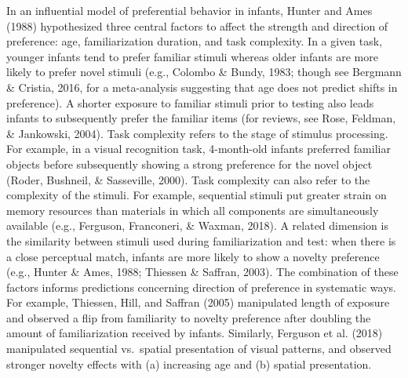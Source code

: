 \documentclass[
  english,
  man,man,floatsintext]{apa6}
\begin{document}
In an influential model of preferential behavior in infants, Hunter and Ames (1988) hypothesized three central factors to affect the strength and direction of preference: age, familiarization duration, and task complexity. In a given task, younger infants tend to prefer familiar stimuli whereas older infants are more likely to prefer novel stimuli (e.g., Colombo \& Bundy, 1983; though see Bergmann \& Cristia, 2016, for a meta-analysis suggesting that age does not predict shifts in preference). A shorter exposure to familiar stimuli prior to testing also leads infants to subsequently prefer the familiar items (for reviews, see Rose, Feldman, \& Jankowski, 2004). Task complexity refers to the stage of stimulus processing. For example, in a visual recognition task, 4-month-old infants preferred familiar objects before subsequently showing a strong preference for the novel object (Roder, Bushneil, \& Sasseville, 2000). Task complexity can also refer to the complexity of the stimuli. For example, sequential stimuli put greater strain on memory resources than materials in which all components are simultaneously available (e.g., Ferguson, Franconeri, \& Waxman, 2018). A related dimension is the similarity between stimuli used during familiarization and test: when there is a close perceptual match, infants are more likely to show a novelty preference (e.g., Hunter \& Ames, 1988; Thiessen \& Saffran, 2003). The combination of these factors informs predictions concerning direction of preference in systematic ways. For example, Thiessen, Hill, and Saffran (2005) manipulated length of exposure and observed a flip from familiarity to novelty preference after doubling the amount of familiarization received by infants. Similarly, Ferguson et al. (2018) manipulated sequential vs.~spatial presentation of visual patterns, and observed stronger novelty effects with (a) increasing age and (b) spatial presentation.
\end{document}
